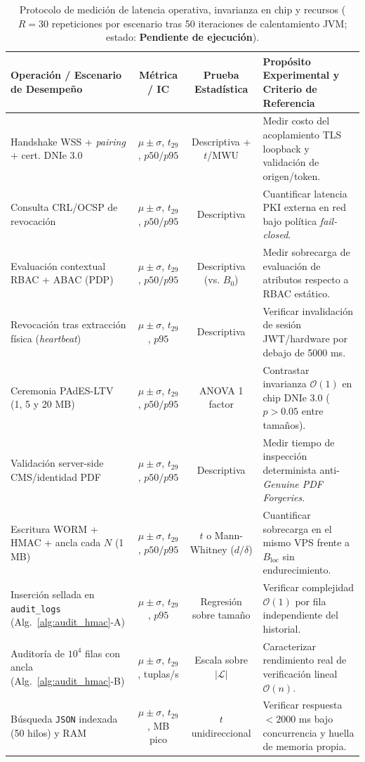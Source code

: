 \documentclass[runningheads,twocolumn]{llncs}
\begin{document}
\begin{table}[t]
\caption{Protocolo de medición de latencia operativa, invarianza en chip y recursos ($R = 30$ repeticiones por escenario tras 50 iteraciones de calentamiento JVM; estado: \textbf{Pendiente de ejecución}).}
\label{tab:latency_protocol}
\scriptsize
\setlength{\tabcolsep}{3.0pt}
\renewcommand{\arraystretch}{1.12}
\begin{tabularx}{\textwidth}{@{}>{\raggedright\arraybackslash}p{4.6cm}cc>{\raggedright\arraybackslash}X@{}}
\toprule
\textbf{Operación / Escenario de Desempeño} & \textbf{Métrica / IC} & \textbf{Prueba Estadística} & \textbf{Propósito Experimental y Criterio de Referencia} \\
\midrule
Handshake WSS + \textit{pairing} + cert. DNIe 3.0 & $\mu\pm\sigma$, $t_{29}$, $p50/p95$ & Descriptiva + $t$/MWU & Medir costo del acoplamiento TLS loopback y validación de origen/token. \\
Consulta CRL/OCSP de revocación & $\mu\pm\sigma$, $t_{29}$, $p50/p95$ & Descriptiva & Cuantificar latencia PKI externa en red bajo política \textit{fail-closed}. \\
Evaluación contextual RBAC + ABAC (PDP) & $\mu\pm\sigma$, $t_{29}$, $p50/p95$ & Descriptiva (vs. $B_0$) & Medir sobrecarga de evaluación de atributos respecto a RBAC estático. \\
Revocación tras extracción física (\textit{heartbeat}) & $\mu\pm\sigma$, $t_{29}$, $p95$ & Descriptiva & Verificar invalidación de sesión JWT/hardware por debajo de 5000 ms. \\
\midrule
Ceremonia PAdES-LTV (1, 5 y 20 MB) & $\mu\pm\sigma$, $t_{29}$, $p50/p95$ & ANOVA 1 factor & Contrastar invarianza $\mathcal{O}(1)$ en chip DNIe 3.0 ($p > 0.05$ entre tamaños). \\
Validación server-side CMS/identidad PDF & $\mu\pm\sigma$, $t_{29}$, $p50/p95$ & Descriptiva & Medir tiempo de inspección determinista anti-\textit{Genuine PDF Forgeries}. \\
\midrule
Escritura WORM + HMAC + ancla cada $N$ (1 MB) & $\mu\pm\sigma$, $t_{29}$, $p50/p95$ & $t$ o Mann-Whitney ($d/\delta$) & Cuantificar sobrecarga en el mismo VPS frente a $B_{\text{loc}}$ sin endurecimiento. \\
Inserción sellada en \texttt{audit\_logs} (Alg.~\ref{alg:audit_hmac}-A) & $\mu\pm\sigma$, $t_{29}$, $p95$ & Regresión sobre tamaño & Verificar complejidad $\mathcal{O}(1)$ por fila independiente del historial. \\
Auditoría de $10^4$ filas con ancla (Alg.~\ref{alg:audit_hmac}-B) & $\mu\pm\sigma$, $t_{29}$, tuplas/s & Escala sobre $|\mathcal{L}|$ & Caracterizar rendimiento real de verificación lineal $\mathcal{O}(n)$. \\
Búsqueda \texttt{JSON} indexada (50 hilos) y RAM & $\mu\pm\sigma$, $t_{29}$, MB pico & $t$ unidireccional & Verificar respuesta $<2000$ ms bajo concurrencia y huella de memoria propia. \\
\bottomrule
\end{tabularx}
\end{table}
\end{document}
